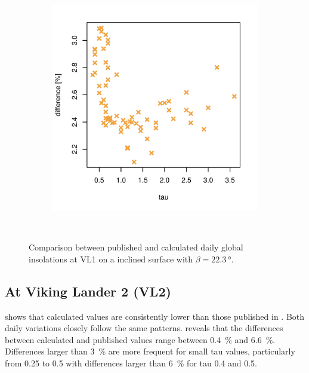 \begin{figure}[H]
\begin{subfigure}[t]{\subfigureWidth}
            \includegraphics[height=\graphicsHeight]{sections/appendix/insolation-calculation-verification/plots/h-diff-bet-exp-calc-at-vl1-with-beta-223-deg.png}
            \label{fig:sub:comparative-global-insolation-at-vl1-beta-equals-phi-percentage-differences}
    \end{subfigure}\\[0.8ex]
    \caption{Comparison between published and calculated daily global insolations at \ac{VL1} on a inclined surface with $\beta=\SI{22.3}{\degree}$.}
    \label{fig:plot:comparative-global-insolation-at-vl1-beta-equals-phi}
\vspace{-2ex}
\end{figure}

\subsection{At Viking Lander 2 (VL2)}
 shows that calculated values are consistently lower than those published in . Both daily variations closely follow the same patterns.  reveals that the differences between calculated and published values range between \SI{0.4}{\percent} and \SI{6.6}{\percent}. Differences larger than \SI{3}{\percent} are more frequent for small tau values, particularly from 0.25 to 0.5 with differences larger than \SI{6}{\percent} for tau 0.4 and 0.5.

